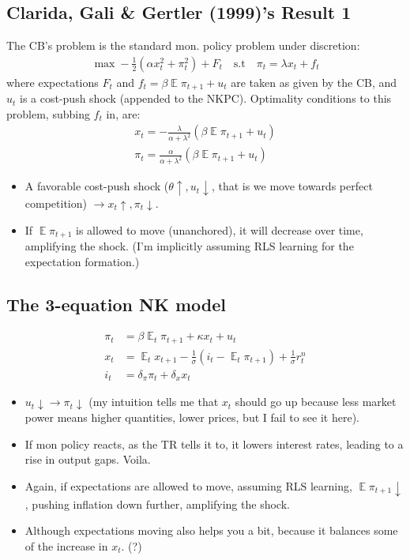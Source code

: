 \documentclass[11pt]{article}
\renewcommand{\[}{\begin{equation}}
\renewcommand{\]}{\end{equation}}
\DeclareMathOperator{\E}{\mathbb{E}}
\begin{document}
\subsection{Clarida, Gali \& Gertler (1999)'s Result 1}
The CB's problem is the standard mon. policy problem under discretion:
\begin{align}
\max -\frac{1}{2}(\alpha x_t^2 + \pi_t^2 ) + F_t \quad \text{s.t} \quad \pi_t = \lambda x_t + f_t
\end{align}
where expectations $F_t$ and $f_t = \beta \E \pi_{t+1} + u_t$ are taken as given by the CB, and $u_t$ is a cost-push shock (appended to the NKPC). Optimality conditions to this problem, subbing $f_t$ in, are:
\begin{align}
x_t = -\frac{\lambda}{\alpha + \lambda^2}(\beta \E \pi_{t+1} + u_t) \\
\pi_t = \frac{\alpha}{\alpha + \lambda^2}(\beta \E \pi_{t+1} + u_t) 
\end{align}
\begin{itemize}
\item A favorable cost-push shock ($\theta  \uparrow, u_t \downarrow$, that is we move towards perfect competition) $\rightarrow x_t \uparrow, \pi_t \downarrow$.
\item If $\E \pi_{t+1}$ is allowed to move (unanchored), it will decrease over time, amplifying the shock. (I'm implicitly assuming RLS learning for the expectation formation.)
\end{itemize}

\subsection{The 3-equation NK model}
\begin{align}
\pi_t & = \beta \E_t\pi_{t+1} + \kappa x_t  + u_t\\
x_t & = \E_t x_{t+1} -\frac{1}{\sigma} (i_t - \E_t\pi_{t+1}) + \frac{1}{\sigma}r_t^n \\
i_t & = \delta_{\pi} \pi_t + \delta_x x_t
\end{align}
\begin{itemize}
\item $u_t \downarrow \rightarrow \pi_t \downarrow$ (my intuition tells me that $x_t$ should go up because less market power means higher quantities, lower prices, but I fail to see it here).
\item If mon policy reacts, as the TR tells it to, it lowers interest rates, leading to a rise in output gaps. Voila. 
\item Again, if expectations are allowed to move, assuming RLS learning, $\E\pi_{t+1} \downarrow$, pushing inflation down further, amplifying the shock. 
\item Although expectations moving also helps you a bit, because it balances some of the increase in $x_t$. (?)
\end{itemize}
\end{document}
